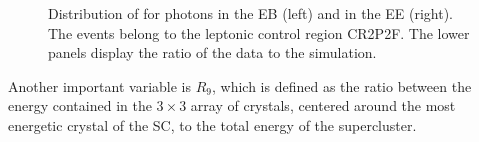 \begin{figure}
%
\caption{Distribution of \sieie for photons in the EB (left) and in the EE (right).
The events belong to the leptonic control region CR2P2F.
The lower panels display the ratio of the data to the simulation.}
\label{fig:sieie_CR2P2F}
\end{figure}

Another important variable is $R_9$, which is defined as the ratio between the energy contained in the $3 \times 3$ array of crystals,
centered around the most energetic crystal of the SC,
to the total energy of the supercluster.

